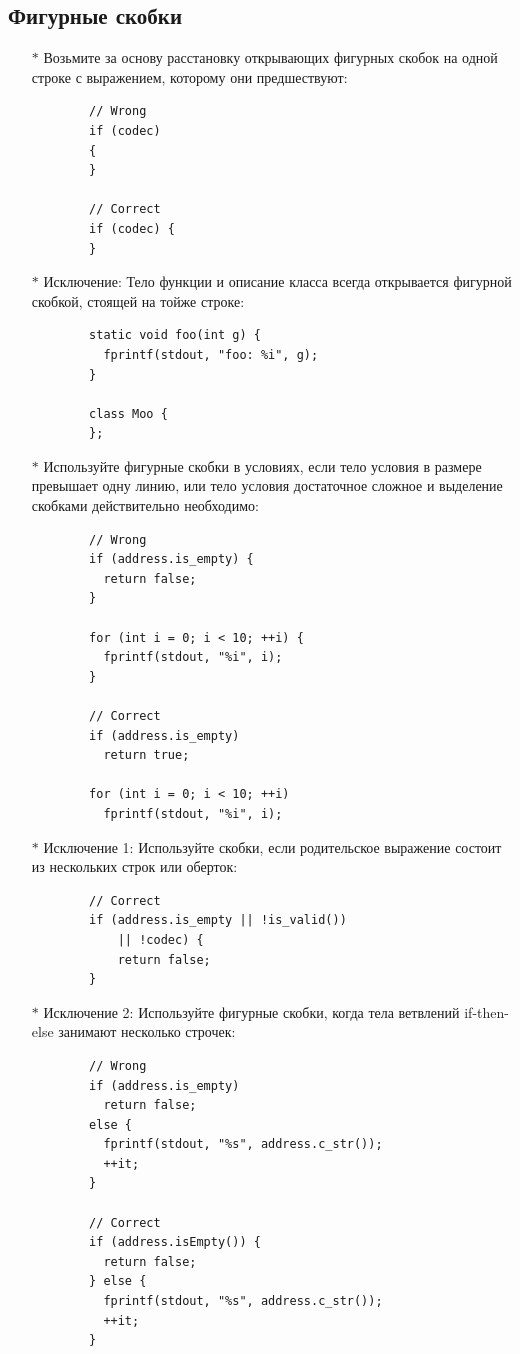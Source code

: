 \documentclass[12pt, twoside]{report}
\begin{document}
\subsection*{Фигурные скобки}\label{lab_work_formatting_brices1}
\begin{itemize}
	\item [$*$] Возьмите за основу расстановку открывающих фигурных скобок на одной строке с выражением, которому они предшествуют:
	\begin{lstlisting}
		// Wrong
		if (codec)
		{
		}
		
		// Correct
		if (codec) {
		}
	\end{lstlisting}
	\item [$*$] Исключение: Тело функции и описание класса всегда открывается фигурной скобкой, стоящей на тойже строке:
	\begin{lstlisting}
		static void foo(int g) {
		  fprintf(stdout, "foo: %i", g);
		}
		
		class Moo {
		};
	\end{lstlisting}
	\item [$*$] Используйте фигурные скобки в условиях, если тело условия в размере превышает одну линию, или тело условия достаточное сложное и выделение скобками действительно необходимо:
	\begin{lstlisting}
		// Wrong
		if (address.is_empty) {
		  return false;
		}
		
		for (int i = 0; i < 10; ++i) {
		  fprintf(stdout, "%i", i);
		}
		
		// Correct
		if (address.is_empty)
		  return true;
		  
		for (int i = 0; i < 10; ++i)
		  fprintf(stdout, "%i", i);
	\end{lstlisting}
	\item [$*$] Исключение 1: Используйте скобки, если родительское выражение состоит из нескольких строк или оберток:
	\begin{lstlisting}
		// Correct
		if (address.is_empty || !is_valid())
		    || !codec) {
			return false;
		}
	\end{lstlisting}
	\item [$*$] Исключение 2: Используйте фигурные скобки, когда тела ветвлений if-then-else занимают несколько строчек:
	\begin{lstlisting}
		// Wrong
		if (address.is_empty)
		  return false;
		else {
		  fprintf(stdout, "%s", address.c_str());
		  ++it;
		}
		
		// Correct
		if (address.isEmpty()) {
		  return false;
		} else {
		  fprintf(stdout, "%s", address.c_str());
		  ++it;
		}
		

\end{lstlisting}
\end{itemize}
\end{document}
